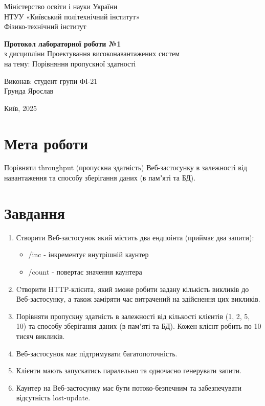 \documentclass[12pt,a4paper]{article}
\begin{document}
\begin{titlepage}
\centering
Міністерство освіти і науки України \\
НТУУ «Київський політехнічний інститут» \\
Фізико-технічний інститут
\vfill

\textbf{Протокол лабораторної роботи №1} \\ %
з дисципліни Проектування високонавантажених систем \\ %
на тему: Порівняння пропускної здатності
\vfill

\begin{flushright}
Виконав: студент групи ФІ-21 \\
Грунда Ярослав \\
\end{flushright}

\vfill
Київ, 2025
\end{titlepage}

\section*{Мета роботи}
Порівняти throughput (пропускна здатність) Веб-застосунку в залежності від навантаження та способу зберігання даних (в памʼяті та БД).


\section*{Завдання}
\begin{enumerate}
\item Створити Веб-застосунок який містить два ендпоінта (приймає два запити):\\
\begin{itemize}
\item /inc - інкрементує внутрішній каунтер\\
\item /count - повертає значення каунтера\\
\end{itemize}
\item Cтворити HTTP-клієнта, який зможе робити задану кількість викликів до Веб-застосунку, а також заміряти час витрачений на здійснення цих викликів.
\item Порівняти пропускну здатність в залежності від кількості клієнтів (1, 2, 5, 10) та способу зберігання даних (в памʼяті та БД). 
Кожен клієнт робить по 10 тисяч викликів.
\item Веб-застосунок має підтримувати багатопоточність.
\item Клієнти мають запускатись паралельно та одночасно генерувати запити.
\item Каунтер на Веб-застосунку має бути потоко-безпечним та забезпечувати відсутність lost-update.
\end{enumerate}
\tableofcontents
\newpage
\end{document}
